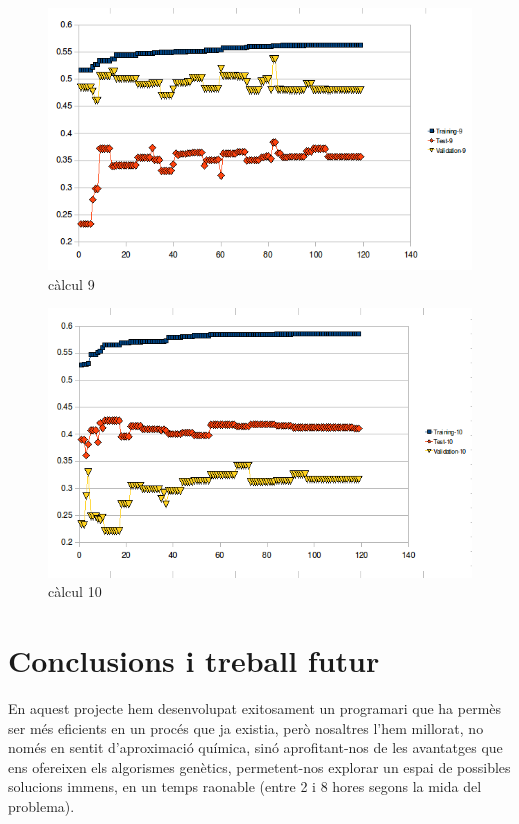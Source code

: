 \begin{figure}[h]
\begin{center}
\includegraphics[scale=0.75]{pholus/pholus9.png}
\end{center}
\caption{càlcul 9}
\label{fig:pholusResult9}
\end{figure}

\begin{figure}[h]
\begin{center}
\includegraphics[scale=0.75]{pholus/pholus10.png}
\end{center}
\caption{càlcul 10}
\label{fig:pholusResult10}
\end{figure}

\section{Conclusions i treball futur} %
\label{sec:PConclusions i treball futur}
En aquest projecte hem desenvolupat exitosament un programari que ha permès ser
més eficients en un procés que ja existia, però nosaltres l'hem millorat, no
només en sentit d'aproximació química, sinó aprofitant-nos de les avantatges que
ens ofereixen els algorismes genètics, permetent-nos explorar un espai de
possibles solucions immens, en un temps raonable (entre 2 i 8 hores segons la
mida del problema).

